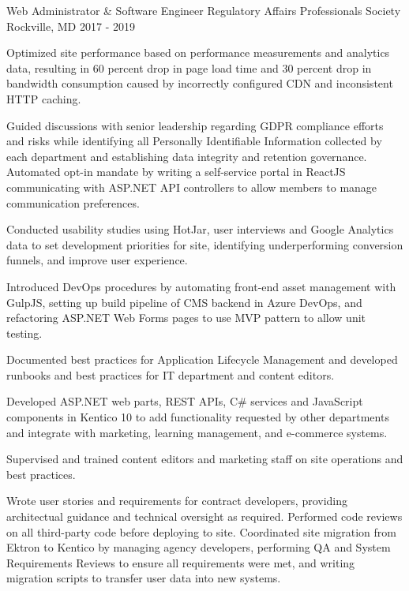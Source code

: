 \begin{cventries}
  \cventry
    {Web Administrator \& Software Engineer} %
    {Regulatory Affairs Professionals Society} %
    {Rockville, MD} %
    {2017 - 2019} %
    {
      \begin{cvitems} %
        \item {Optimized site performance based on performance measurements and analytics data, resulting in 60 percent drop in page load time and 30 percent drop in bandwidth consumption caused by incorrectly configured CDN and inconsistent HTTP caching.}
        \item {Guided discussions with senior leadership regarding GDPR compliance efforts and risks while identifying all Personally Identifiable Information collected by each department and establishing data integrity and retention governance. Automated opt-in mandate by writing a self-service portal in ReactJS communicating with ASP.NET API controllers to allow members to manage communication preferences.}
        \item {Conducted usability studies using HotJar, user interviews and Google Analytics data to set development priorities for site, identifying underperforming conversion funnels, and improve user experience.}
        \item {Introduced DevOps procedures by automating front-end asset management with GulpJS, setting up build pipeline of CMS backend in Azure DevOps, and refactoring ASP.NET Web Forms pages to use MVP pattern to allow unit testing.}
         \item {Documented best practices for Application Lifecycle Management and developed runbooks and best practices for IT department and content editors.}
         \item {Developed ASP.NET web parts, REST APIs, C\# services and JavaScript components in Kentico 10 to add functionality requested by other departments and integrate with marketing, learning management, and e-commerce systems.}
        \item {Supervised and trained content editors and marketing staff on site operations and best practices.}
        \item {Wrote user stories and requirements for contract developers, providing architectual guidance and technical oversight as required. Performed code reviews on all third-party code before deploying to site. Coordinated site migration from Ektron to Kentico by managing agency developers, performing QA and System Requirements Reviews to ensure all requirements were met, and writing migration scripts to transfer user data into new systems.}
      \end{cvitems}
    }


\end{cventries}
